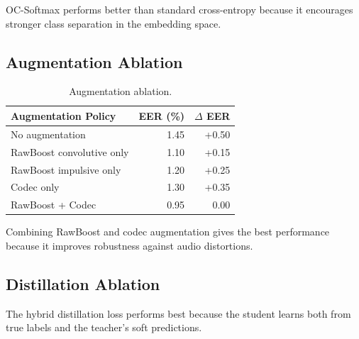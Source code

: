\documentclass[sigconf]{acmart}
\begin{document}
OC-Softmax performs better than standard cross-entropy because it encourages stronger class separation in the embedding space.

\subsection{Augmentation Ablation}

\begin{table}[h]
\centering
\caption{Augmentation ablation.}
\label{tab:augmentation}
\begin{tabular}{lrr}
\toprule
Augmentation Policy & EER (\%) & $\Delta$ EER \\
\midrule
No augmentation & 1.45 & +0.50 \\
RawBoost convolutive only & 1.10 & +0.15 \\
RawBoost impulsive only & 1.20 & +0.25 \\
Codec only & 1.30 & +0.35 \\
RawBoost + Codec & 0.95 & 0.00 \\
\bottomrule
\end{tabular}
\end{table}

Combining RawBoost and codec augmentation gives the best performance because it improves robustness against audio distortions.

\subsection{Distillation Ablation}

\begin{table}[h]
\centering
\caption{Student distillation ablation.}
\label{tab:distillation}
\end{table}

The hybrid distillation loss performs best because the student learns both from true labels and the teacher's soft predictions.
\end{document}
